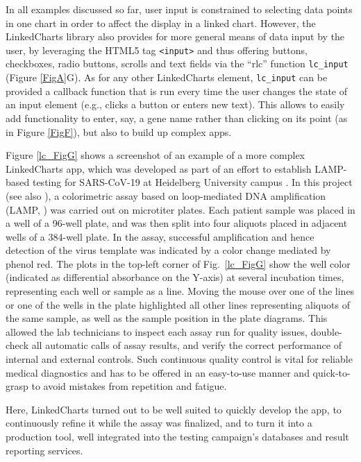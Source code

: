 \documentclass[twocolumn,10pt]{article}
\begin{document}
In all examples discussed so far, user input is constrained to selecting data points in one chart in order to affect the display in a linked chart. However, the LinkedCharts library also provides for more general means of data input by the user, by leveraging the HTML5 tag \texttt{<input>} and thus offering buttons, checkboxes, radio buttons, scrolls and text fields via the ``rlc'' function \texttt{lc_input} (Figure \ref{FigA}G). As for any other LinkedCharts element, \texttt{lc_input} can be provided a callback function that is run every time the user changes the state of an input element (e.g., clicks a button or enters new text). This allows to easily add functionality to enter, say, a gene name rather than clicking on its point (as in Figure \ref{FigF}), but also to build up complex apps.

Figure \ref{lc_FigG} shows a screenshot of an example of a more complex LinkedCharts app, which was developed as part of an effort to establish LAMP-based testing for SARS-CoV-19 at Heidelberg University campus \citep{daothi_2020}. In this project (see also \citep{herbst_2021}), a colorimetric assay based on loop-mediated DNA amplification (LAMP, \citep{notomi_2000}) was carried out on microtiter plates. Each patient sample was placed in a well of a 96-well plate, and was then split into four aliquots placed in adjacent wells of a 384-well plate. In the assay, successful amplification and hence detection of the virus template was indicated by a color change mediated by phenol red. The plots in the top-left corner of Fig.\ \ref{lc_FigG} show the well color (indicated as differential absorbance on the Y-axis) at several incubation times, representing each well or sample as a line. Moving the mouse over one of the lines or one of the wells in the plate highlighted all other lines representing aliquots of the same sample, as well as the sample position in the plate diagrams. This allowed the lab technicians to inspect each assay run for quality issues, double-check all automatic calls of assay results, and verify the correct performance of internal and external controls. Such continuous quality control is vital for reliable medical diagnostics and has to be offered in an easy-to-use manner and quick-to-grasp to avoid mistakes from repetition and fatigue.

Here, LinkedCharts turned out to be well suited to quickly develop the app, to continuously refine it while the assay was finalized, and to turn it into a production tool, well integrated into the testing campaign's databases and result reporting services.
\end{document}
